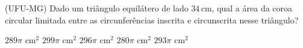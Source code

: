 \noindent\parbox{\linewidth}{

(UFU-MG) Dado um triângulo equilátero de lado $34$\,cm, qual a área da coroa circular limitada entre as circunferências inscrita e circunscrita nesse triângulo?

$289\pi$ cm$^2$
$299\pi$ cm$^2$
$296\pi$ cm$^2$
$280\pi$ cm$^2$
$293\pi$ cm$^2$



}


